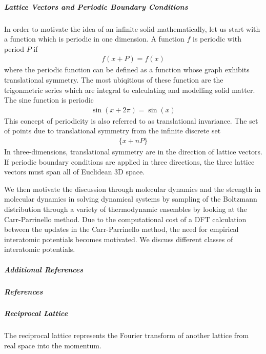 \documentclass[letterpaper,10pt,english]{sphinxmanual}
\begin{document}
\subparagraph{Lattice Vectors and Periodic Boundary Conditions}
\label{\detokenize{crystallography/perfect_crystal:lattice-vectors-and-periodic-boundary-conditions}}
In order to motivate the idea of an infinite solid mathematically, let us start with a function which is periodic in one dimension.  A function \(f\) is periodic with period \(P\) if
\begin{equation*}
\begin{split}f(x+P) = f(x)\end{split}
\end{equation*}
where the periodic function can be defined as a function whose graph exhibits translational symmetry.  The most ubiqitious of these function are the trigonmetric series which are integral to calculating and modelling solid matter.  The sine function is periodic
\begin{equation*}
\begin{split}\sin(x+2\pi) = \sin(x)\end{split}
\end{equation*}
This concept of periodicity is also referred to as translational invariance.  The set of points due to translational symmetry from the infinite discrete set
\begin{equation*}
\begin{split}\{ x + n P \}\end{split}
\end{equation*}
In three-dimensions, translational symmetry are in the direction of lattice vectors.  If periodic boundary conditions are applied in three directions, the three lattice vectors must span all of Euclidean 3D space.

We then motivate the discussion through molecular dynamics and the strength in molecular dynamics in solving dynamical systems by sampling of the Boltzmann distribution through a variety of thermodynamic ensembles by looking at the Carr-Parrinello method.  Due to the computational cost of a DFT calculation between the updates in the Carr-Parrinello method, the need for empirical interatomic potentials becomes motivated.  We discuss different classes of interatomic potentials.


\subparagraph{Additional References}
\label{\detokenize{crystallography/perfect_crystal:additional-references}}

\subparagraph{References}
\label{\detokenize{crystallography/perfect_crystal:references}}



\subparagraph{Reciprocal Lattice}
\label{\detokenize{crystallography/reciprocal_lattice:reciprocal-lattice}}\label{\detokenize{crystallography/reciprocal_lattice:id1}}\label{\detokenize{crystallography/reciprocal_lattice::doc}}
The reciprocal lattice represents the Fourier transform of another lattice from real space into the momentum.
\end{document}
